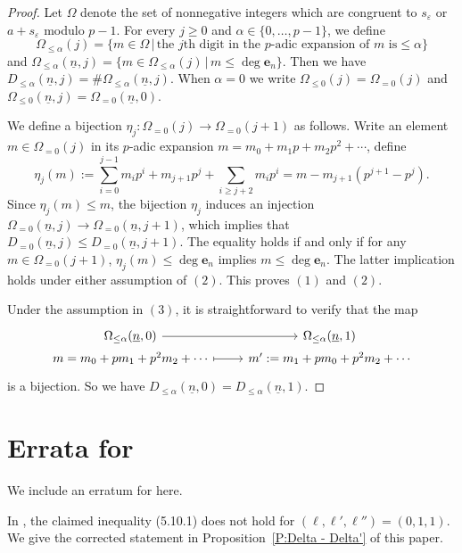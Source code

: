 \documentclass[12pt]{amsart}
\theoremstyle{definition}
\numberwithin{equation}{subsection}
\def\bfe{\mathbf{e}}
\begin{document}
\begin{proof}
Let $\Omega$ denote the set of nonnegative integers which are congruent to $s_{\varepsilon}$ or $a+s_\varepsilon$ modulo $p-1$. For every $j\geq 0$ and $\alpha\in \{0,\dots, p-1 \}$, we define 
\[
\Omega_{\leq \alpha}(j)=\{m\in \Omega\,| \,\text{the~}j\text{th digit in the~}p\text{-adic expansion of~}m \text{~is} \leq \alpha \}
\]
and $\Omega_{\leq \alpha}(\underline n, j)=\{m\in \Omega_{\leq \alpha}(j)\, |\,m\leq \deg \bfe_n \}$. Then we have $D_{\leq \alpha}(\underline n,j)=\# \Omega_{\leq \alpha}(\underline n,j)$. When $\alpha=0$ we write $\Omega_{\leq 0}(j)=\Omega_{=0}(j)$ and $\Omega_{\leq 0}(\underline n, j)=\Omega_{=0}(\underline n, 0)$. 
	
We define a bijection $\eta_j: \Omega_{=0}(j)\rightarrow \Omega_{=0}(j+1)$ as follows. Write an element $m\in \Omega_{=0}(j)$ in its $p$-adic expansion $m=m_0+m_1p+m_2p^2+\cdots$, define
$$
\eta_j(m):=\sum_{i=0}^{j-1}m_ip^i+m_{j+1}p^j+\sum_{i\geq j+2}m_ip^i=m-m_{j+1}(p^{j+1}-p^j).
$$
Since $\eta_j(m)\leq m$, the bijection $\eta_j$ induces an injection $\Omega_{=0}(\underline n, j)\rightarrow \Omega_{=0}(\underline n,j+1)$, which implies that $D_{=0}(\underline n,j)\leq D_{=0}(\underline n, j+1)$. The equality holds if and only if for any $m\in \Omega_{=0}(j+1)$, $\eta_j(m)\leq \deg\bfe_n$ implies $m\leq \deg\bfe_n$. The latter implication holds under either assumption of $(2)$. This proves $(1)$ and $(2)$.
	
	Under the assumption in $(3)$, it is straightforward to verify that the map
\[
\begin{tikzcd}[row sep = 0pt]
\Omega_{\leq \alpha}(\underline n,0)\ar[r] & \Omega_{\leq \alpha}(\underline n, 1)
\\
m=m_0+pm_1+p^2m_2+\cdots \ar[r, mapsto] & m':= m_1+pm_0+p^2m_2+\cdots
\end{tikzcd}
\]
is a bijection. So we have $D_{\leq \alpha}(\underline n,0)=D_{\leq\alpha}(\underline n,1)$. 
\end{proof}

\section{Errata for \cite{liu-truong-xiao-zhao}}

We include an erratum for \cite{liu-truong-xiao-zhao} here.

In \cite[Corollary~5.10]{liu-truong-xiao-zhao}, the claimed inequality (5.10.1) does not hold for $(\ell,\ell',\ell'')=(0,1,1)$. We give the corrected statement in Proposition~\ref{P:Delta - Delta'} of this paper.
\end{document}
